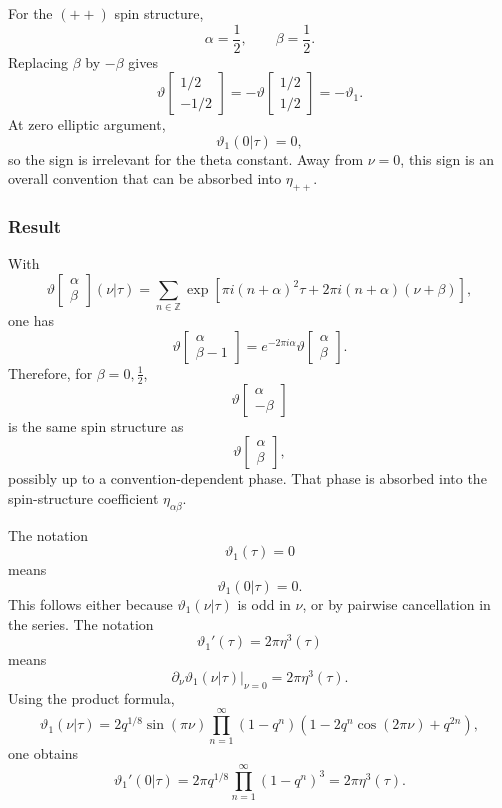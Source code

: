 \documentclass[
  10pt,
  a4paper,
  openany]{book}
\begin{document}
For the \((++)\) spin structure, \[
\alpha=\frac{1}{2},
\qquad
\beta=\frac{1}{2}.
\] Replacing \(\beta\) by \(-\beta\) gives \[
\vartheta\begin{bmatrix}
1/2\\
-1/2
\end{bmatrix}
=
-
\vartheta\begin{bmatrix}
1/2\\
1/2
\end{bmatrix}
=
-\vartheta_1.
\] At zero elliptic argument, \[
\vartheta_1(0|\tau)=0,
\] so the sign is irrelevant for the theta constant. Away from
\(\nu=0\), this sign is an overall convention that can be absorbed into
\(\eta_{++}\).

\subsubsection{Result}\label{result-6}

With \[
\vartheta\begin{bmatrix}
\alpha\\
\beta
\end{bmatrix}(\nu|\tau)
=
\sum_{n\in\mathbb Z}
\exp\left[
\pi i(n+\alpha)^2\tau
+
2\pi i(n+\alpha)(\nu+\beta)
\right],
\] one has \[
\vartheta\begin{bmatrix}
\alpha\\
\beta-1
\end{bmatrix}
=
e^{-2\pi i\alpha}
\vartheta\begin{bmatrix}
\alpha\\
\beta
\end{bmatrix}.
\] Therefore, for \(\beta=0,\frac{1}{2}\), \[
\vartheta\begin{bmatrix}
\alpha\\
-\beta
\end{bmatrix}
\] is the same spin structure as \[
\vartheta\begin{bmatrix}
\alpha\\
\beta
\end{bmatrix},
\] possibly up to a convention-dependent phase. That phase is absorbed
into the spin-structure coefficient \(\eta_{\alpha\beta}\).

The notation \[
\vartheta_1(\tau)=0
\] means \[
\vartheta_1(0|\tau)=0.
\] This follows either because \(\vartheta_1(\nu|\tau)\) is odd in
\(\nu\), or by pairwise cancellation in the series. The notation \[
\vartheta_1'(\tau)=2\pi\eta^3(\tau)
\] means \[
\left.\partial_\nu\vartheta_1(\nu|\tau)\right|_{\nu=0}
=
2\pi\eta^3(\tau).
\] Using the product formula, \[
\vartheta_1(\nu|\tau)
=
2q^{1/8}\sin(\pi\nu)
\prod_{n=1}^\infty
(1-q^n)(1-2q^n\cos(2\pi\nu)+q^{2n}),
\] one obtains \[
\vartheta_1'(0|\tau)
=
2\pi q^{1/8}\prod_{n=1}^\infty(1-q^n)^3
=
2\pi\eta^3(\tau).
\]
\end{document}
